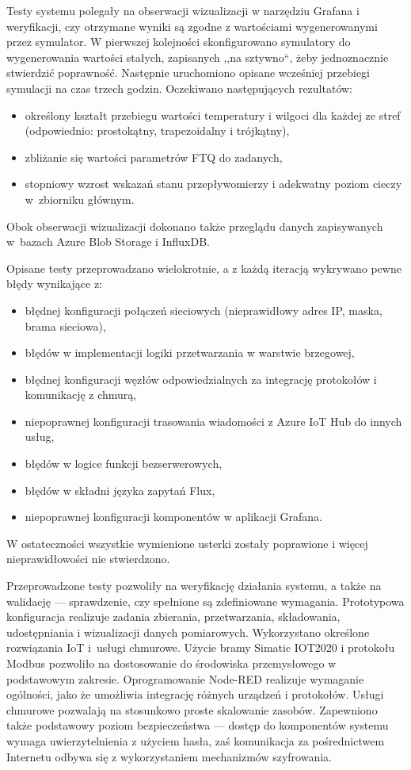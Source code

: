 \documentclass[a4paper, 12pt, twoside]{article}
\begin{document}
Testy systemu polegały na obserwacji wizualizacji w narzędziu Grafana i weryfikacji,
czy otrzymane wyniki są zgodne z wartościami wygenerowanymi przez symulator.
W pierwszej kolejności skonfigurowano symulatory do wygenerowania wartości stałych,
zapisanych ,,na sztywno``, żeby jednoznacznie stwierdzić poprawność. Następnie 
uruchomiono opisane wcześniej przebiegi symulacji na czas trzech godzin. 
Oczekiwano następujących rezultatów:
\begin{itemize}
      \itemsep0em
      \item określony kształt przebiegu wartości temperatury i wilgoci dla każdej 
      ze stref (odpowiednio: prostokątny, trapezoidalny i trójkątny),
      \item zbliżanie się wartości parametrów FTQ do zadanych,
      \item stopniowy wzrost wskazań stanu przepływomierzy i adekwatny poziom cieczy 
      w~zbiorniku głównym. 
\end{itemize}
\noindent Obok obserwacji wizualizacji dokonano także przeglądu danych zapisywanych
w~bazach Azure Blob Storage i InfluxDB. 

Opisane testy przeprowadzano wielokrotnie, a z każdą iteracją wykrywano 
pewne błędy wynikające z:
\begin{itemize}
      \itemsep0em
      \item błędnej konfiguracji połączeń sieciowych (nieprawidłowy adres IP, maska, brama sieciowa),
      \item błędów w implementacji logiki przetwarzania w warstwie brzegowej,
      \item błędnej konfiguracji węzłów odpowiedzialnych za integrację protokołów i komunikację z chmurą,
      \item niepoprawnej konfiguracji trasowania wiadomości z Azure IoT Hub do innych usług,
      \item błędów w logice funkcji bezserwerowych, 
      \item błędów w składni języka zapytań Flux,
      \item niepoprawnej konfiguracji komponentów w aplikacji Grafana.  
\end{itemize}
\noindent W ostateczności wszystkie wymienione usterki zostały poprawione i więcej nieprawidłowości nie
stwierdzono. 

Przeprowadzone testy pozwoliły na weryfikację działania systemu, a także na
walidację --- sprawdzenie, czy spełnione są zdefiniowane wymagania. Prototypowa 
konfiguracja realizuje zadania zbierania, przetwarzania, składowania,
udostępniania i wizualizacji danych pomiarowych. Wykorzystano określone rozwiązania
IoT i~usługi chmurowe. Użycie bramy Simatic IOT2020 i protokołu Modbus pozwoliło na dostosowanie 
do środowiska przemysłowego w podstawowym zakresie. Oprogramowanie Node-RED
realizuje wymaganie ogólności, jako że umożliwia integrację różnych urządzeń i protokołów.
Usługi chmurowe pozwalają na stosunkowo proste skalowanie zasobów. Zapewniono
także podstawowy poziom bezpieczeństwa --- dostęp do komponentów systemu wymaga uwierzytelnienia
z użyciem hasła, zaś komunikacja za pośrednictwem Internetu odbywa się z wykorzystaniem mechanizmów
szyfrowania.
\end{document}
